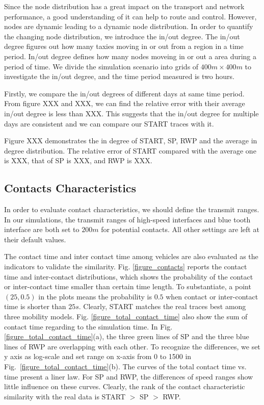 Since the node distribution has a great impact on the transport and network performance, a good understanding of it can help to route and control.  However, nodes are dynamic leading to a dynamic node distribution. In order to quantify the changing node distribution,  we introduce the in/out degree. The in/out degree figures out how many taxies moving in or out from a region in a time period. In/out degree defines how many nodes moveing in or out a area during a period of time. 
We divide the simulation scenario into grids of $ 400m \times 400 m$ to investigate the in/out degree, and the time period measured is two hours. 

Firstly, we compare the in/out degrees of different days at same time period. From figure XXX and XXX, we can find the relative error with their average in/out degree is less than XXX. This suggests     that the in/out degree for multiple days are consistent and we can compare our START traces with it.

Figure XXX demonstrates the in degree of START, SP, RWP and the average in degree distribution. The relative error of START compared with the average one is XXX, that of SP is XXX,  and RWP is XXX.



\subsection{Contacts Characteristics}
In order to evaluate contact characteristics, we should define the transmit ranges.
In our simulations, the transmit ranges of high-speed interfaces and blue tooth interface are both set to $200m$ for potential contacts.
All other settings are left at their default values.

The contact time and inter contact time among vehicles are also evaluated as the indicators to validate the similarity.
Fig. \ref{figure_contacts} reports the contact time and inter-contact distributions, which shows the probability of the contact or inter-contact time smaller than certain time length. To substantiate, a point $(25,0.5)$ in the plots means the probability is $0.5$ when contact or inter-contact time is shorter than $25s$. Clearly, START matches the real traces best among three mobility models.
Fig. \ref{figure_total_contact_time} also show the sum of contact time regarding to the simulation time.
In Fig. \ref{figure_total_contact_time}(a), the three green lines of SP and the three blue lines of RWP are overlapping with each other.
To recognize the differences, we set y axis as log-scale and set range on x-axis from 0 to 1500 in Fig.~\ref{figure_total_contact_time}(b). The curves of the total contact time vs. time present a liner law. For SP and RWP, the differences of speed ranges show little influence on these curves.
Clearly, the rank of the contact characteristic similarity with the real data is START $>$ SP $>$ RWP.

